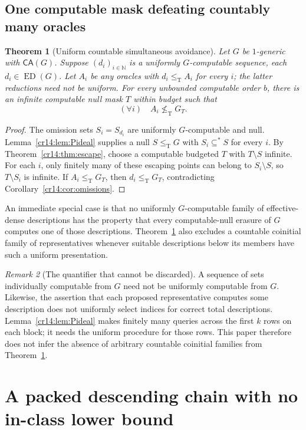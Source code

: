 \documentclass[11pt,a4paper]{article}
\newcommand{\N}{\mathbb N}
\newcommand{\leT}{\leq_{\mathrm T}}
\newcommand{\nleT}{\nleq_{\mathrm T}}
\newcommand{\ED}{\operatorname{ED}}
\newcommand{\substar}{\subseteq^{*}}
\newcommand{\CA}{\mathsf{CA}}
\newtheorem{theorem}{Theorem}[section]
\theoremstyle{definition}
\theoremstyle{remark}
\newtheorem{remark}[theorem]{Remark}
\begin{document}
\subsection{One computable mask defeating countably many oracles}
\begin{theorem}[Uniform countable simultaneous avoidance]
\label{cr14:thm:countable}
Let $G$ be $1$-generic with $\CA(G)$. Suppose $(d_i)_{i\in\N}$ is a
uniformly $G$-computable sequence, each $d_i\in\ED(G)$. Let $A_i$ be
any oracles with $d_i\leT A_i$ for every $i$; the latter reductions need
not be uniform. For every unbounded computable order $b$, there is an
infinite computable null mask $T$ within budget such that
\[
 (\forall i)\quad A_i\nleT G_T.
\]
\end{theorem}
\begin{proof}
The omission sets $S_i=S_{d_i}$ are uniformly $G$-computable and null.
Lemma~\ref{cr14:lem:Pideal} supplies a null $S\leT G$ with $S_i\substar S$
for every $i$. By Theorem~\ref{cr14:thm:escape}, choose a computable budgeted
$T$ with $T\setminus S$ infinite. For each $i$, only finitely many of
these escaping points can belong to $S_i\setminus S$, so
$T\setminus S_i$ is infinite. If $A_i\leT G_T$, then
$d_i\leT G_T$, contradicting Corollary~\ref{cr14:cor:omissions}.
\end{proof}

An immediate special case is that no uniformly $G$-computable family of
effective-dense descriptions has the property that every computable-null
erasure of $G$ computes one of those descriptions. Theorem~\ref{cr14:thm:countable}
also excludes a countable coinitial family of representatives whenever
suitable descriptions below its members have such a uniform presentation.

\begin{remark}[The quantifier that cannot be discarded]\label{cr14:rem:uniform}
A sequence of sets individually computable from $G$ need not be uniformly
computable from $G$. Likewise, the assertion that each proposed
representative computes some description does not uniformly select indices
for correct total descriptions. Lemma~\ref{cr14:lem:Pideal} makes finitely many
queries across the first $k$ rows on each block; it needs the uniform
procedure for those rows. This paper therefore does not infer the absence
of arbitrary countable coinitial families from Theorem~\ref{cr14:thm:countable}.
\end{remark}

\section{A packed descending chain with no in-class lower bound}
\label{cr14:sec:chain}
\end{document}
